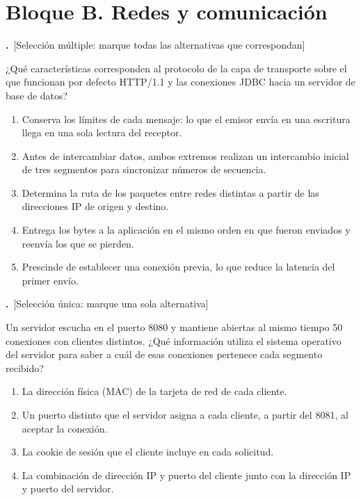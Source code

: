 \documentclass[11pt,a4paper]{article}
\newif\ifclave
\newcounter{preg}
\newcommand{\tipounica}{\textcolor{uteqMid}{\small\textsf{[Selección única: marque una sola alternativa]}}}
\newcommand{\tipomultiple}{\textcolor{uteqAmber!80!black}{\small\textsf{[Selección múltiple: marque todas las alternativas que correspondan]}}}
\newcommand{\pregunta}[2]{%
	\refstepcounter{preg}%
	\par\medskip
	\noindent\textbf{\color{uteqBlue}\arabic{preg}.}~#1\par
	\noindent #2\par\nopagebreak
}
\newcommand{\ok}{\ifclave~\textcolor{uteqGreen}{\ding{51}~\textbf{Correcta}}\fi}
\newenvironment{opciones}{%
	\begin{enumerate}[label={$\square$\ \alph*)},leftmargin=2.6em,itemsep=1pt,topsep=2pt]
}{%
	\end{enumerate}
}
\newcommand{\just}[1]{%
	\ifclave
		\begin{tcolorbox}[colback=uteqGreen!6,colframe=uteqGreen!70!black,boxrule=0.4pt,arc=1mm,left=4pt,right=4pt,top=2pt,bottom=2pt,fontupper=\small]
			\textbf{Justificación:} #1
		\end{tcolorbox}
	\fi
}
\begin{document}
\section*{\color{uteqBlue}\large Bloque B. Redes y comunicación}

\pregunta{\tipomultiple}{¿Qué características corresponden al protocolo de la capa de transporte sobre el que funcionan por defecto HTTP/1.1 y las conexiones JDBC hacia un servidor de base de datos?}
\begin{opciones}
	\item Conserva los límites de cada mensaje: lo que el emisor envía en una escritura llega en una sola lectura del receptor.
	\item Antes de intercambiar datos, ambos extremos realizan un intercambio inicial de tres segmentos para sincronizar números de secuencia.\ok
	\item Determina la ruta de los paquetes entre redes distintas a partir de las direcciones IP de origen y destino.
	\item Entrega los bytes a la aplicación en el mismo orden en que fueron enviados y reenvía los que se pierden.\ok
	\item Prescinde de establecer una conexión previa, lo que reduce la latencia del primer envío.
\end{opciones}
\just{El protocolo es TCP: orientado a conexión (saludo de tres vías), con entrega ordenada y retransmisión \cite{rfc9293}. TCP es un flujo de bytes y no conserva límites de mensajes (eso es propio de UDP); el enrutamiento por IP corresponde a la capa de red; operar sin conexión es característica de UDP.}

\pregunta{\tipounica}{Un servidor escucha en el puerto 8080 y mantiene abiertas al mismo tiempo 50 conexiones con clientes distintos. ¿Qué información utiliza el sistema operativo del servidor para saber a cuál de esas conexiones pertenece cada segmento recibido?}
\begin{opciones}
	\item La dirección física (MAC) de la tarjeta de red de cada cliente.
	\item Un puerto distinto que el servidor asigna a cada cliente, a partir del 8081, al aceptar la conexión.
	\item La cookie de sesión que el cliente incluye en cada solicitud.
	\item La combinación de dirección IP y puerto del cliente junto con la dirección IP y puerto del servidor.\ok
\end{opciones}
\just{Cada conexión TCP se identifica por el par de \emph{sockets} de ambos extremos (IP y puerto locales y remotos) \cite{rfc9293}; por eso todas comparten el puerto 8080 del servidor. La MAC no sobrevive al primer enrutador, el servidor no cambia de puerto por cliente y la cookie pertenece a la capa de aplicación, no al sistema operativo.}
\end{document}
